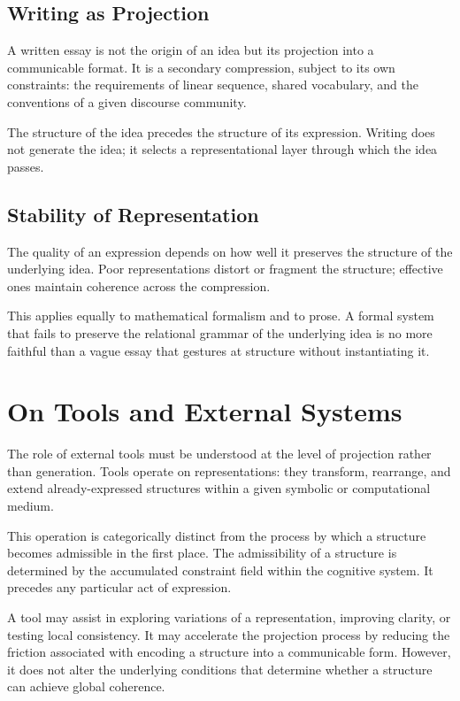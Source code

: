 \documentclass[11pt]{article}
\theoremstyle{plain}
\theoremstyle{definition}
\theoremstyle{remark}
\begin{document}
\subsection{Writing as Projection}

A written essay is not the origin of an idea but its projection into
a communicable format. It is a secondary compression, subject to its
own constraints: the requirements of linear sequence, shared vocabulary,
and the conventions of a given discourse community.

The structure of the idea precedes the structure of its expression.
Writing does not generate the idea; it selects a representational layer
through which the idea passes.

\subsection{Stability of Representation}

The quality of an expression depends on how well it preserves the
structure of the underlying idea. Poor representations distort or
fragment the structure; effective ones maintain coherence across the
compression.

This applies equally to mathematical formalism and to prose. A formal
system that fails to preserve the relational grammar of the underlying
idea is no more faithful than a vague essay that gestures at structure
without instantiating it.

\section{On Tools and External Systems}

The role of external tools must be understood at the level of projection
rather than generation. Tools operate on representations: they transform,
rearrange, and extend already-expressed structures within a given symbolic
or computational medium.

This operation is categorically distinct from the process by which a
structure becomes admissible in the first place. The admissibility of
a structure is determined by the accumulated constraint field within
the cognitive system. It precedes any particular act of expression.

A tool may assist in exploring variations of a representation, improving
clarity, or testing local consistency. It may accelerate the projection
process by reducing the friction associated with encoding a structure
into a communicable form. However, it does not alter the underlying
conditions that determine whether a structure can achieve global coherence.
\end{document}

